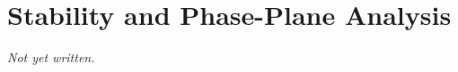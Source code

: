 \chapter{Stability and Phase-Plane Analysis}\label{ch:stability-phase-plane}


\textit{Not yet written.}
